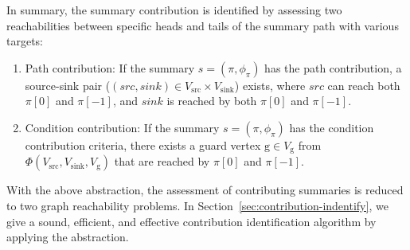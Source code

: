 In summary, the summary contribution is identified by assessing two reachabilities between specific heads and tails of the summary path with various targets:
\begin{enumerate}
    \item Path contribution: If the summary $s=(\pi, \phi_{\pi})$ has the path contribution, a source-sink pair ($(src, sink) \in V_{\text{src}} \times V_{\text{sink}}$) exists, where $src$ can reach both $\pi[0]$ and $\pi[-1]$, and $sink$ is reached by both $\pi[0]$ and $\pi[-1]$.
   \item Condition contribution: If the summary $s=(\pi, \phi_{\pi})$ has the condition contribution criteria, there exists a guard vertex $\text{g} \in V_{\text{g}}$ from $\Phi(V_{\text{src}}, V_{\text{sink}}, V_{\text{g}})$ that are reached by $\pi[0]$ and $\pi[-1]$.
\end{enumerate}

With the above abstraction, the assessment of contributing summaries is reduced to two graph reachability problems. 
In Section~\ref{sec:contribution-indentify}, we give a sound, efficient, and effective contribution identification algorithm by applying the abstraction.

    





